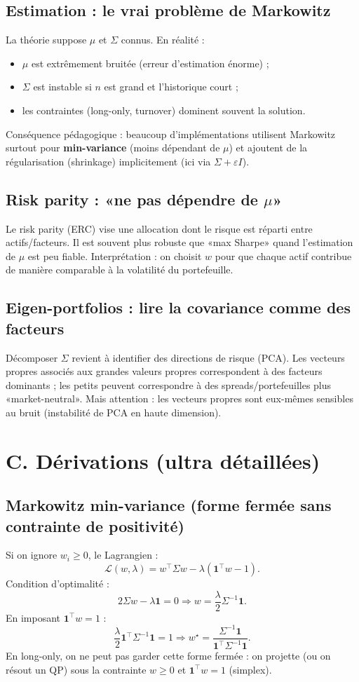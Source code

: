 \documentclass[11pt,a4paper]{report}
\theoremstyle{definition}
\theoremstyle{plain}
\theoremstyle{remark}
\newcommand{\1}{\mathbf{1}}
\begin{document}
\subsection*{Estimation : le vrai problème de Markowitz}
La théorie suppose $\mu$ et $\Sigma$ connus. En réalité :
\begin{itemize}[leftmargin=*]
\item $\mu$ est extrêmement bruitée (erreur d'estimation énorme) ;
\item $\Sigma$ est instable si $n$ est grand et l'historique court ;
\item les contraintes (long-only, turnover) dominent souvent la solution.
\end{itemize}
Conséquence pédagogique : beaucoup d'implémentations utilisent Markowitz surtout pour \textbf{min-variance} (moins dépendant de $\mu$) et ajoutent de la régularisation (shrinkage) implicitement (ici via $\Sigma+\varepsilon I$).

\subsection*{Risk parity : «ne pas dépendre de $\mu$»}
Le risk parity (ERC) vise une allocation dont le risque est réparti entre actifs/facteurs.
Il est souvent plus robuste que «max Sharpe» quand l'estimation de $\mu$ est peu fiable.
Interprétation : on choisit $w$ pour que chaque actif contribue de manière comparable à la volatilité du portefeuille.

\subsection*{Eigen-portfolios : lire la covariance comme des facteurs}
Décomposer $\Sigma$ revient à identifier des directions de risque (PCA).
Les vecteurs propres associés aux grandes valeurs propres correspondent à des facteurs dominants ; les petits peuvent correspondre à des spreads/portefeuilles plus «market-neutral».
Mais attention : les vecteurs propres sont eux-mêmes sensibles au bruit (instabilité de PCA en haute dimension).

\section{C. Dérivations (ultra détaillées)}
\subsection*{Markowitz min-variance (forme fermée sans contrainte de positivité)}
Si on ignore $w_i\ge 0$, le Lagrangien :
\[
\mathcal{L}(w,\lambda)=w^\top \Sigma w - \lambda(\bm{1}^\top w - 1).
\]
Condition d'optimalité :
\[
2\Sigma w - \lambda \bm{1}=0 \Rightarrow w = \frac{\lambda}{2}\Sigma^{-1}\bm{1}.
\]
En imposant $\bm{1}^\top w=1$ :
\[
\frac{\lambda}{2}\bm{1}^\top\Sigma^{-1}\bm{1}=1 \Rightarrow
w^\star=\frac{\Sigma^{-1}\bm{1}}{\bm{1}^\top\Sigma^{-1}\bm{1}}.
\]
En long-only, on ne peut pas garder cette forme fermée : on projette (ou on résout un QP) sous la contrainte $w\ge 0$ et $\bm{1}^\top w=1$ (simplex).
\end{document}

